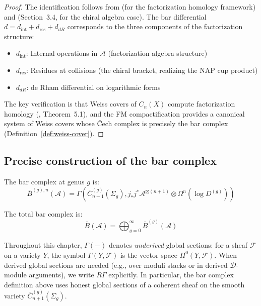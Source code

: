 \begin{proof}
The identification follows from \cite{AF15} (for the factorization homology framework) and \cite{BD04} (Section~3.4, for the chiral algebra case).  The bar differential $d = d_{\text{int}} + d_{\text{res}} + d_{dR}$ corresponds to the three components of the factorization structure:
\begin{itemize}
\item $d_{\text{int}}$: Internal operations in $\mathcal{A}$ (factorization algebra structure)
\item $d_{\text{res}}$: Residues at collisions (the chiral bracket, realizing the NAP cup product)
\item $d_{dR}$: de Rham differential on logarithmic forms
\end{itemize}
The key verification is that Weiss covers of $C_n(X)$ compute factorization homology (\cite{AF15}, Theorem~5.1), and the FM compactification provides a canonical system of Weiss covers whose \v{C}ech complex is precisely the bar complex (Definition~\ref{def:weiss-cover}).
\end{proof}

\subsection{Precise construction of the bar complex}

\begin{definition}
The bar complex at genus $g$ is:
\[\bar{B}^{(g),n}(\mathcal{A}) = \Gamma\left(\overline{C}_{n+1}^{(g)}(\Sigma_g), j_*j^*\mathcal{A}^{\boxtimes(n+1)} \otimes \Omega^n(\log D^{(g)})\right)\]

The total bar complex is:
\[\bar{B}(\mathcal{A}) = \bigoplus_{g=0}^{\infty} \bar{B}^{(g)}(\mathcal{A})\]
\end{definition}

\begin{convention}\label{conv:gamma-vs-rgamma}
Throughout this chapter, $\Gamma(-)$ denotes \emph{underived} global sections:
for a sheaf $\mathcal{F}$ on a variety $Y$, the symbol $\Gamma(Y, \mathcal{F})$
is the vector space $H^0(Y, \mathcal{F})$.  When derived global sections are
needed (e.g., over moduli stacks or in derived $\mathcal{D}$-module arguments),
we write $R\Gamma$ explicitly.  In particular, the bar complex definition above
uses honest global sections of a coherent sheaf on the smooth variety
$\overline{C}_{n+1}^{(g)}(\Sigma_g)$.
\end{convention}

